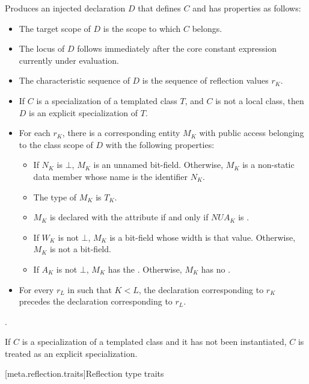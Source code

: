 \begin{itemdescr}
\pnum
\effects
Produces an injected declaration $D$
that defines $C$ and has properties as follows:
\begin{itemize}
\item
  The target scope of $D$
  is the scope to which $C$ belongs.
\item
  The locus of $D$
  follows immediately after the core constant expression
  currently under evaluation.
\item
  The characteristic sequence of $D$
  is the sequence of reflection values $r_K$.
\item
  If $C$ is a specialization of a templated class $T$,
  and $C$ is not a local class,
  then $D$ is an explicit specialization of $T$.
\item
  For each $r_K$,
  there is a corresponding entity $M_K$
  with public access
  belonging to the class scope of $D$
  with the following properties:
  \begin{itemize}
  \item
    If $N_K$ is $\bot$,
    $M_K$ is an unnamed bit-field.
    Otherwise, $M_K$ is a non-static data member whose name is the identifier
    $N_K$.
  \item
    The type of $M_K$ is $T_K$.
  \item
    $M_K$ is declared with the attribute 
    if and only if $\mathit{NUA}_K$ is .
  \item
    If $W_K$ is not $\bot$,
    $M_K$ is a bit-field whose width is that value.
    Otherwise, $M_K$ is not a bit-field.
  \item
    If $A_K$ is not $\bot$,
    $M_K$ has the  .
    Otherwise, $M_K$ has no .
  \end{itemize}
  \item
    For every $r_L$ in  such that $K < L$,
    the declaration corresponding to $r_K$
    precedes the declaration corresponding to $r_L$.
\end{itemize}

\pnum
\returns
{}.

\pnum
\remarks
If $C$ is a specialization of a templated class and
it has not been instantiated,
$C$ is treated as an explicit specialization.
\end{itemdescr}

[meta.reflection.traits]{Reflection type traits}

